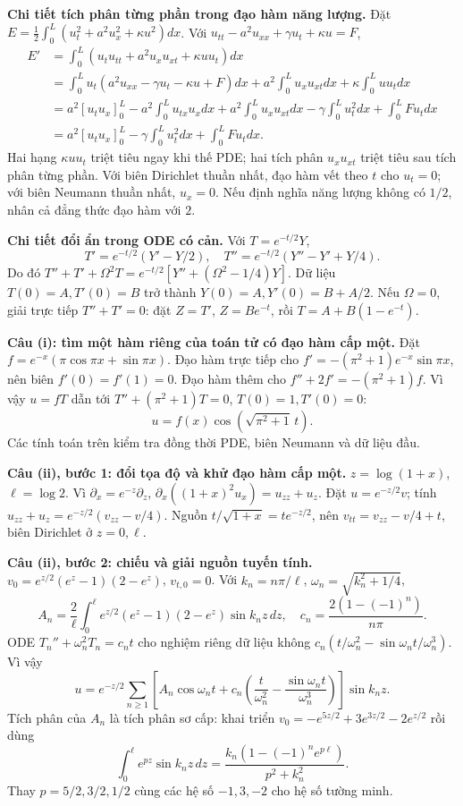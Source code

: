 \textbf{Chi tiết tích phân từng phần trong đạo hàm năng lượng.} Đặt $E=\frac12\int_0^L(u_t^2+a^2u_x^2+\kappa u^2)dx$. Với $u_{tt}-a^2u_{xx}+\gamma u_t+\kappa u=F$,
\[\begin{aligned}
E'&=\int_0^L(u_tu_{tt}+a^2u_xu_{xt}+\kappa uu_t)dx\\
&=\int_0^Lu_t(a^2u_{xx}-\gamma u_t-\kappa u+F)dx
+a^2\int_0^Lu_xu_{xt}dx+\kappa\int_0^Luu_tdx\\
&=a^2[u_tu_x]_0^L-a^2\int_0^Lu_{tx}u_xdx
+a^2\int_0^Lu_xu_{xt}dx-\gamma\int_0^Lu_t^2dx+\int_0^LFu_tdx\\
&=a^2[u_tu_x]_0^L-\gamma\int_0^Lu_t^2dx+\int_0^LFu_tdx.
\end{aligned}\]
Hai hạng $\kappa uu_t$ triệt tiêu ngay khi thế PDE; hai tích phân $u_xu_{xt}$ triệt tiêu sau tích phân từng phần. Với biên Dirichlet thuần nhất, đạo hàm vết theo $t$ cho $u_t=0$; với biên Neumann thuần nhất, $u_x=0$. Nếu định nghĩa năng lượng không có $1/2$, nhân cả đẳng thức đạo hàm với $2$.

\textbf{Chi tiết đổi ẩn trong ODE có cản.} Với $T=e^{-t/2}Y$,
\[T'=e^{-t/2}(Y'-Y/2),\quad T''=e^{-t/2}(Y''-Y'+Y/4).\]
Do đó $T''+T'+\Omega^2T=e^{-t/2}[Y''+(\Omega^2-1/4)Y]$. Dữ liệu $T(0)=A,T'(0)=B$ trở thành $Y(0)=A,Y'(0)=B+A/2$. Nếu $\Omega=0$, giải trực tiếp $T''+T'=0$: đặt $Z=T'$, $Z=Be^{-t}$, rồi $T=A+B(1-e^{-t})$.

\textbf{Câu (i): tìm một hàm riêng của toán tử có đạo hàm cấp một.} Đặt $f=e^{-x}(\pi\cos\pi x+\sin\pi x)$. Đạo hàm trực tiếp cho $f'=-(\pi^2+1)e^{-x}\sin\pi x$, nên biên $f'(0)=f'(1)=0$. Đạo hàm thêm cho $f''+2f'=-(\pi^2+1)f$. Vì vậy $u=fT$ dẫn tới $T''+(\pi^2+1)T=0$, $T(0)=1,T'(0)=0$:
\[u=f(x)\cos(\sqrt{\pi^2+1}\,t).\]
Các tính toán trên kiểm tra đồng thời PDE, biên Neumann và dữ liệu đầu.

\textbf{Câu (ii), bước 1: đổi tọa độ và khử đạo hàm cấp một.} $z=\log(1+x)$, $\ell=\log2$. Vì $\partial_x=e^{-z}\partial_z$, $\partial_x((1+x)^2u_x)=u_{zz}+u_z$. Đặt $u=e^{-z/2}v$; tính $u_{zz}+u_z=e^{-z/2}(v_{zz}-v/4)$. Nguồn $t/\sqrt{1+x}=te^{-z/2}$, nên $v_{tt}=v_{zz}-v/4+t$, biên Dirichlet ở $z=0,\ell$.

\textbf{Câu (ii), bước 2: chiếu và giải nguồn tuyến tính.} $v_0=e^{z/2}(e^z-1)(2-e^z)$, $v_{t,0}=0$. Với $k_n=n\pi/\ell$, $\omega_n=\sqrt{k_n^2+1/4}$,
\[A_n=\frac2\ell\int_0^\ell e^{z/2}(e^z-1)(2-e^z)\sin k_nz\,dz,\quad c_n=\frac{2(1-(-1)^n)}{n\pi}.\]
ODE $T_n''+\omega_n^2T_n=c_nt$ cho nghiệm riêng dữ liệu không $c_n(t/\omega_n^2-\sin\omega_nt/\omega_n^3)$. Vì vậy
\[u=e^{-z/2}\sum_{n\ge1}\left[A_n\cos\omega_nt+c_n\left(\frac t{\omega_n^2}-\frac{\sin\omega_nt}{\omega_n^3}\right)\right]\sin k_nz.\]
Tích phân của $A_n$ là tích phân sơ cấp: khai triển $v_0=-e^{5z/2}+3e^{3z/2}-2e^{z/2}$ rồi dùng
\[\int_0^\ell e^{pz}\sin k_nz\,dz=\frac{k_n(1-(-1)^ne^{p\ell})}{p^2+k_n^2}.\]
Thay $p=5/2,3/2,1/2$ cùng các hệ số $-1,3,-2$ cho hệ số tường minh.

